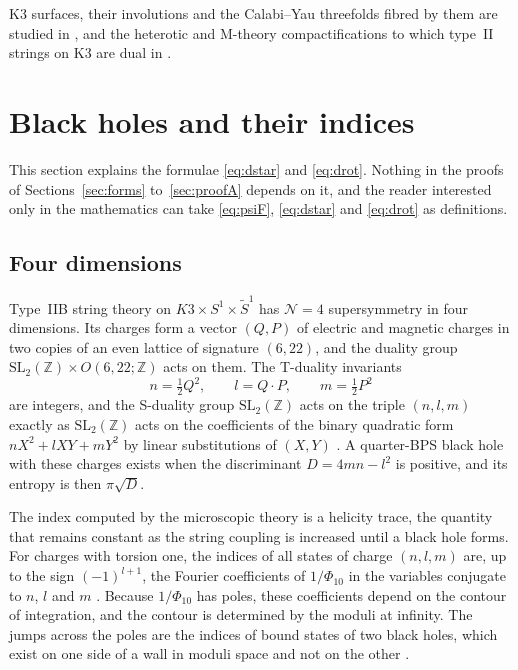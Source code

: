 \documentclass[11pt]{amsart}
\theoremstyle{definition}
\newcommand{\ZZ}{\mathbb{Z}}
\begin{document}
K3 surfaces, their involutions and the Calabi--Yau threefolds fibred by them are studied in \cite{Bha22,BN26}, and the heterotic and M-theory compactifications to which type~II strings on K3 are dual in \cite{SBBT26}.

\section{Black holes and their indices}\label{sec:physics}

This section explains the formulae \eqref{eq:dstar} and \eqref{eq:drot}. Nothing in the proofs of Sections~\ref{sec:forms} to~\ref{sec:proofA} depends on it, and the reader interested only in the mathematics can take \eqref{eq:psiF}, \eqref{eq:dstar} and \eqref{eq:drot} as definitions.

\subsection{Four dimensions}\label{ssec:4d}
Type~IIB string theory on $K3\times S^1\times\widetilde S^1$ has $\mathcal N=4$ supersymmetry in four dimensions. Its charges form a vector $(Q,P)$ of electric and magnetic charges in two copies of an even lattice of signature $(6,22)$, and the duality group $\mathrm{SL}_2(\ZZ)\times O(6,22;\ZZ)$ acts on them. The T-duality invariants
\[
n=\tfrac12Q^2,\qquad l=Q\cdot P,\qquad m=\tfrac12P^2
\]
are integers, and the S-duality group $\mathrm{SL}_2(\ZZ)$ acts on the triple $(n,l,m)$ exactly as $\mathrm{SL}_2(\ZZ)$ acts on the coefficients of the binary quadratic form $nX^2+lXY+mY^2$ by linear substitutions of $(X,Y)$ \cite{Sen08r}. A quarter-BPS black hole with these charges exists when the discriminant $D=4mn-l^2$ is positive, and its entropy is then $\pi\sqrt D$.

The index computed by the microscopic theory is a helicity trace, the quantity that remains constant as the string coupling is increased until a black hole forms. For charges with torsion one, the indices of all states of charge $(n,l,m)$ are, up to the sign $(-1)^{l+1}$, the Fourier coefficients of $1/\Phi_{10}$ in the variables conjugate to $n$, $l$ and $m$ \cite{DVV97,Sen08r}. Because $1/\Phi_{10}$ has poles, these coefficients depend on the contour of integration, and the contour is determined by the moduli at infinity. The jumps across the poles are the indices of bound states of two black holes, which exist on one side of a wall in moduli space and not on the other \cite{Sen08r}.
\end{document}
